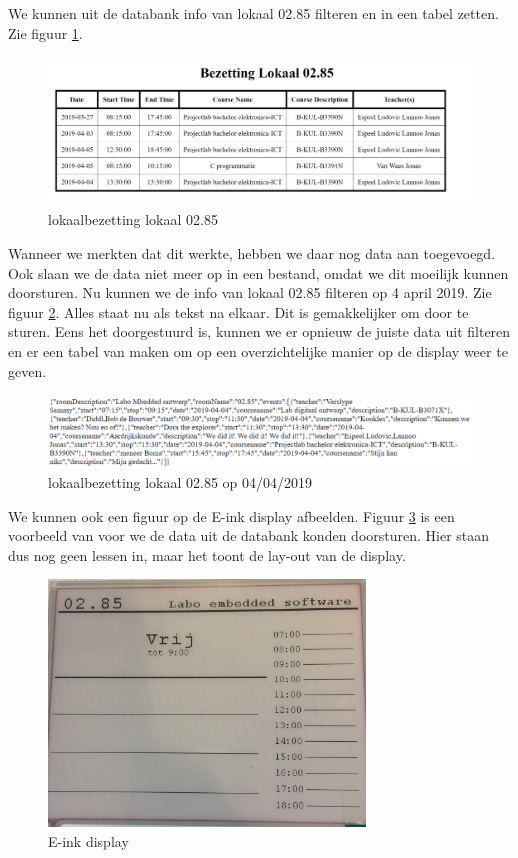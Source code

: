 \documentclass[a4paper,kul]{kulakarticle} %
\begin{document}
We kunnen uit de databank info van lokaal 02.85 filteren en in een tabel zetten. Zie figuur \ref{fig:vboutput}.

\begin{figure}[h]
	\centering
	\includegraphics[width=1\textwidth]{vbDatabank}
	\caption{lokaalbezetting lokaal 02.85}
	\label{fig:vboutput}
\end{figure}

Wanneer we merkten dat dit werkte, hebben we daar nog data aan toegevoegd. Ook slaan we de data niet meer op in een bestand, omdat we dit moeilijk kunnen doorsturen. Nu kunnen we de info van lokaal 02.85 filteren op 4 april 2019. Zie figuur \ref{fig:vbdata}. Alles staat nu als tekst na elkaar. Dit is gemakkelijker om door te sturen. Eens het doorgestuurd is, kunnen we er opnieuw de juiste data uit filteren en er een tabel van maken om op een overzichtelijke manier op de display weer te geven.

\begin{figure}[h]
	\centering
	\includegraphics[width=1\textwidth]{vbData02_85}
	\caption{lokaalbezetting lokaal 02.85 op 04/04/2019}
	\label{fig:vbdata}
\end{figure}

We kunnen ook een figuur op de E-ink display afbeelden. Figuur \ref{fig:vbscherm} is een voorbeeld van voor we de data uit de databank konden doorsturen. Hier staan dus nog geen lessen in, maar het toont de lay-out van de display.
\newline
\begin{figure}[h]
	\centering
	\includegraphics[width=0.75\textwidth]{vbScherm}
	\caption{E-ink display}
	\label{fig:vbscherm}
\end{figure}
\end{document}
